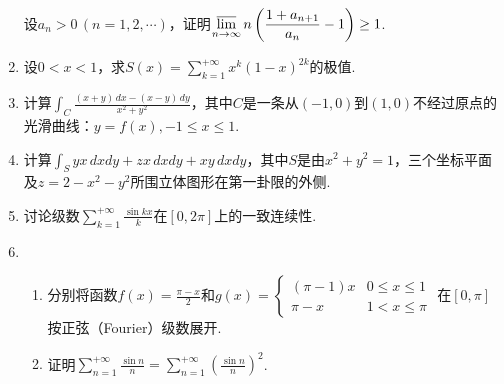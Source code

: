 \documentclass{article}
\begin{document}
\begin{enumerate}
设$a_n>0\,(n=1,2,\cdots)$，证明$\displaystyle \varlimsup_{n\to\infty}n\left(\frac{1+a_{n+1}}{a_n}-1\right)\ge 1$.
\item
设$0<x<1$，求$\displaystyle S(x)=\sum_{k=1}^{+\infty}x^k(1-x)^{2k}$的极值.
\item
计算$\displaystyle \int_C \frac{(x+y)\,dx-(x-y)\,dy}{x^2+y^2}$，其中$C$是一条从$(-1,0)$到$(1,0)$不经过原点的光滑曲线：$y=f(x),-1\le x\le 1$.
\item
计算$\displaystyle \int_S yx\,dxdy+zx\,dxdy+xy\,dxdy$，其中$S$是由$x^2+y^2=1$，三个坐标平面及$z=2-x^2-y^2$所围立体图形在第一卦限的外侧.
\item
讨论级数$\displaystyle \sum_{k=1}^{+\infty}\frac{\sin kx}{k}$在$[0,2\pi]$上的一致连续性.
\item
\begin{enumerate}
\item
分别将函数$\displaystyle f(x)=\frac{\pi - x}{2}$和$\displaystyle g(x)=
\begin{cases}
(\pi-1)x & 0\le x\le 1\\
\pi-x & 1 < x \le \pi
\end{cases}$
在$[0,\pi]$按正弦（Fourier）级数展开.
\item
证明$\displaystyle \sum_{n=1}^{+\infty}\frac{\sin n}{n}=\sum_{n=1}^{+\infty}\left(\frac{\sin n}{n}\right)^2$.
\end{enumerate}
\end{enumerate}
\end{document}
